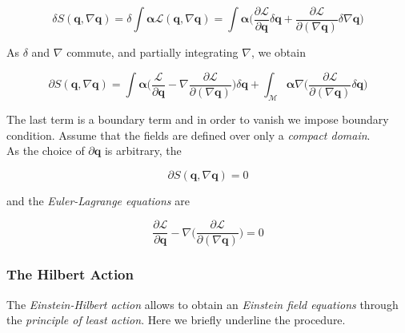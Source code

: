 {    \begin{equation}
        \delta S(\boldsymbol{q}, \nabla\boldsymbol{q}) = \delta\int\boldsymbol{\alpha}\mathcal{L}(\boldsymbol{q}, \nabla\boldsymbol{q}) = \int\boldsymbol{\alpha}\Big(\frac{\partial\mathcal{L}}{\partial\boldsymbol{q}}\delta\boldsymbol{q}+\frac{\partial\mathcal{L}}{\partial(\nabla\boldsymbol{q})}\delta\nabla\boldsymbol{q}\Big)
    \end{equation}
    
    As $\delta$ and $\nabla$ commute, and partially integrating $\nabla$, we obtain
    
    \begin{equation}
        \partial S(\boldsymbol{q}, \nabla\boldsymbol{q}) = \int\boldsymbol{\alpha}\Big(\frac{\mathcal{L}}{\partial\boldsymbol{q}}-\nabla\frac{\partial \mathcal{L}}{\partial(\nabla\boldsymbol{q})}\Big)\delta\boldsymbol{q} + \int_{\mathcal{M}}\boldsymbol{\alpha}\nabla\Big(\frac{\partial\mathcal{L}}{\partial(\nabla\boldsymbol{q})}\delta\boldsymbol{q}\Big)
    \end{equation}
    
    The last term is a boundary term and in order to vanish we impose boundary condition. 
    Assume that the fields are defined over only a \textit{compact domain}. \\
    As the choice of $\partial\boldsymbol{q}$ is arbitrary, the 
    
    \begin{equation}
        \partial S(\boldsymbol{q}, \nabla\boldsymbol{q}) = 0
    \end{equation}
    
    and the \textit{Euler-Lagrange equations} are
    
    \begin{equation}
        \frac{\partial \mathcal{L}}{\partial\boldsymbol{q}} - \nabla\Big(\frac{\partial\mathcal{L}}{\partial(\nabla\boldsymbol{q})}\Big) = 0
        \label{eq:theory:eulerlagrange}
    \end{equation}
    
    \subsubsection{The Hilbert Action}
    
    The \textit{Einstein-Hilbert action} allows to obtain an \textit{Einstein field equations} through the \textit{principle of least action}. Here we briefly underline the procedure.
    
}
